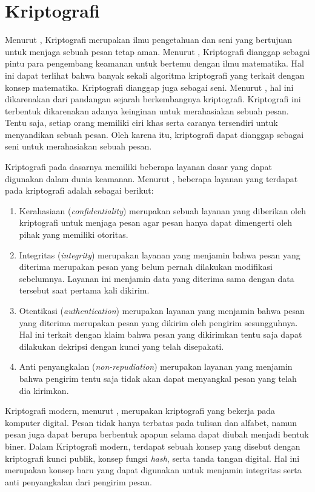 \section{Kriptografi}
Menurut \textcite{schneier1996}, Kriptografi merupakan ilmu pengetahuan dan seni yang bertujuan untuk menjaga sebuah pesan tetap aman. Menurut \textcite{anderson2008}, Kriptografi dianggap sebagai pintu para pengembang keamanan untuk bertemu dengan ilmu matematika. Hal ini dapat terlihat bahwa banyak sekali algoritma kriptografi yang terkait dengan konsep matematika. Kriptografi dianggap juga sebagai seni. Menurut \textcite{munir2019}, hal ini dikarenakan dari pandangan sejarah berkembangnya kriptografi. Kriptografi ini terbentuk dikarenakan adanya keinginan untuk merahasiakan sebuah pesan. Tentu saja, setiap orang memiliki ciri khas serta caranya tersendiri untuk menyandikan sebuah pesan. Oleh karena itu, kriptografi dapat dianggap sebagai seni untuk merahasiakan sebuah pesan. 

Kriptografi pada dasarnya memiliki beberapa layanan dasar yang dapat digunakan dalam dunia keamanan. Menurut \textcite{schneier1996}, beberapa layanan yang terdapat pada kriptografi adalah sebagai berikut:
\begin{enumerate}
  \item Kerahasiaan (\emph{confidentiality}) merupakan sebuah layanan yang diberikan oleh kriptografi untuk menjaga pesan agar pesan hanya dapat dimengerti oleh pihak yang memiliki otoritas. 
  \item Integritas (\emph{integrity}) merupakan layanan yang menjamin bahwa pesan yang diterima merupakan pesan yang belum pernah dilakukan modifikasi sebelumnya. Layanan ini menjamin data yang diterima sama dengan data tersebut saat pertama kali dikirim.
  \item Otentikasi (\emph{authentication}) merupakan layanan yang menjamin bahwa pesan yang diterima merupakan pesan yang dikirim oleh pengirim sesungguhnya. Hal ini terkait dengan klaim bahwa pesan yang dikirimkan tentu saja dapat dilakukan dekripsi dengan kunci yang telah disepakati.
  \item Anti penyangkalan (\emph{non-repudiation}) merupakan layanan yang menjamin bahwa pengirim tentu saja tidak akan dapat menyangkal pesan yang telah dia kirimkan.
\end{enumerate} 

Kriptografi modern, menurut \textcite{munir2019}, merupakan kriptografi yang bekerja pada komputer digital. Pesan tidak hanya terbatas pada tulisan dan alfabet, namun pesan juga dapat berupa berbentuk apapun selama dapat diubah menjadi bentuk biner. Dalam Kriptografi modern, terdapat sebuah konsep yang disebut dengan kriptografi kunci publik, konsep fungsi \emph{hash}, serta tanda tangan digital. Hal ini merupakan konsep baru yang dapat digunakan untuk menjamin integritas serta anti penyangkalan dari pengirim pesan.

